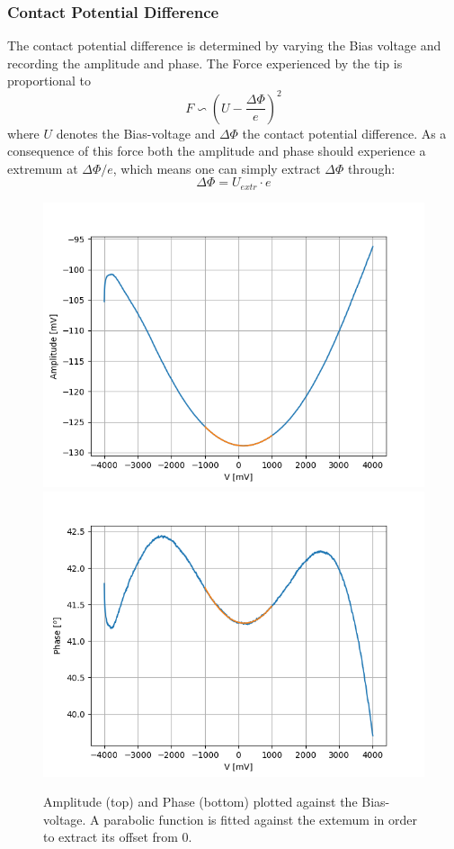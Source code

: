 \documentclass[%
 reprint,
amsmath,amssymb,
pra,
]{revtex4-1}
\begin{document}
\subsubsection{Contact Potential Difference}
The contact potential difference is determined by varying the Bias voltage and recording the amplitude and phase. The Force experienced by the tip is proportional to
\begin{equation}
F \backsim \left(U-\dfrac{\Delta\Phi}{e}\right)^2
\end{equation}
where $U$ denotes the Bias-voltage and $\Delta\Phi$ the contact potential difference. As a consequence of this force both the amplitude and phase should experience a extremum at $\Delta\Phi / e$, which means one can simply extract $\Delta\Phi$ through:
\begin{equation}
\Delta\Phi = U_{extr} \cdot e
\label{eq:phi}
\end{equation}

\begin{figure}
\centering
\includegraphics[scale=0.5]{Bilder/Magnetic/amplitude.PNG}
\includegraphics[scale=0.5]{Bilder/Magnetic/phase.PNG}
\caption{Amplitude (top) and Phase (bottom) plotted against the Bias-voltage. A parabolic function is fitted against the extemum in order to extract its offset from 0.}
\label{fig:bias}
\end{figure}
\end{document}
